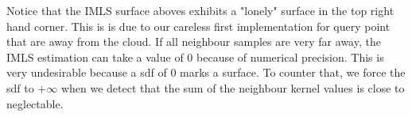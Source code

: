 \documentclass[a4paper]{article}
\begin{document}
Notice that the IMLS surface aboves exhibits a "lonely" surface in the top right hand corner. This is is due to our careless first implementation for query point that are away from the cloud.
If all neighbour samples are very far away, the IMLS estimation can take a value of 0 because of numerical precision. This is very undesirable because a sdf of 0 marks a surface.
To counter that, we force the sdf to $+\infty$ when we detect that the sum of the neighbour kernel values is close to neglectable.
\end{document}
